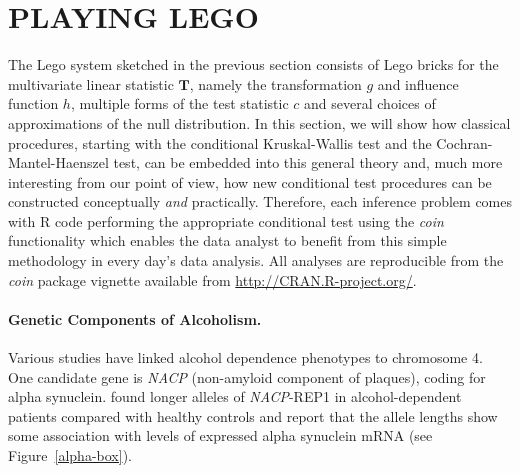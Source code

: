 \documentclass{article}
\newcommand{\Rpackage}[1]{\textit{#1}}
\newcommand{\RR}{\textsf{R}}
\newcommand{\T}{\mathbf{T}}
\begin{document}
\section{PLAYING LEGO \label{play}}

The Lego system sketched in the previous section consists of Lego bricks for 
the multivariate linear statistic $\T$, namely the transformation $g$ and
influence function $h$, multiple forms of the test statistic $c$ and several choices
of approximations of the null distribution. In this section, we will show how
classical procedures, starting with the conditional Kruskal-Wallis test and
the Cochran-Mantel-Haenszel test, can be embedded into this general theory
and, much more interesting from our point of view, how new conditional test
procedures can be constructed conceptually \textit{and} practically. 
Therefore, each inference problem comes with \RR{} code performing the
appropriate conditional test using the \Rpackage{coin} functionality 
which enables the data analyst to benefit from this
simple methodology in every day's data analysis. All analyses are
reproducible from the \Rpackage{coin} package vignette available from
\url{http://CRAN.R-project.org/}.

\paragraph{Genetic Components of Alcoholism.}

Various studies have linked alcohol dependence phenotypes to chromosome 4.  
One candidate gene is \textit{NACP} (non-amyloid component of plaques), 
coding for alpha synuclein. 
\cite{Boenscheta2005} found longer alleles of
\textit{NACP}-REP1 in alcohol-dependent patients compared with healthy controls
and report that the allele lengths show some
association with levels of expressed alpha synuclein mRNA (see
Figure~\ref{alpha-box}).

\end{document}

